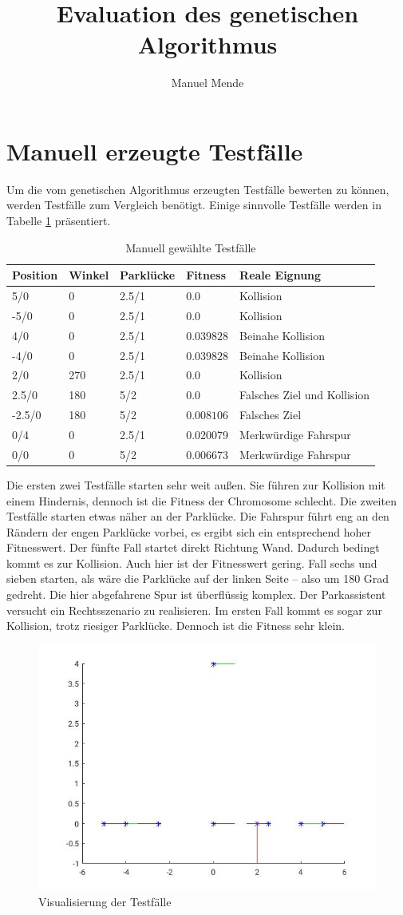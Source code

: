 \documentclass[12pt,a4paper]{article}
\author{Manuel Mende}
\title{Evaluation des genetischen Algorithmus}
\begin{document}
\maketitle
\tableofcontents
\section{Manuell erzeugte Testfälle}
Um die vom genetischen Algorithmus erzeugten Testfälle bewerten zu können, werden Testfälle zum Vergleich benötigt. Einige sinnvolle Testfälle werden in Tabelle \ref{tab:testfaelle} präsentiert.
\begin{table}\centering
\begin{tabular}{l|l|l|l|l}
Position & Winkel & Parklücke & Fitness & Reale Eignung \\\hline
5/0 & 0 & 2.5/1 & $0.0$ & Kollision \\
-5/0 & 0 & 2.5/1 & $0.0$ & Kollision \\
4/0 & 0 & 2.5/1 & $0.039828$ & Beinahe Kollision \\
-4/0 & 0 & 2.5/1 & $0.039828$ & Beinahe Kollision \\
2/0 & 270 & 2.5/1 & $0.0$ & Kollision \\
2.5/0 & 180 & 5/2 & $0.0$ & Falsches Ziel und Kollision \\
-2.5/0 & 180 & 5/2 & $0.008106$ & Falsches Ziel \\
0/4 &  0 & 2.5/1 & 0.020079 & Merkwürdige Fahrspur \\
0/0 &  0 & 5/2 & 0.006673 & Merkwürdige Fahrspur \\
\end{tabular}
\caption{Manuell gewählte Testfälle}
\label{tab:testfaelle}
\end{table}
Die ersten zwei Testfälle starten sehr weit außen. Sie führen zur Kollision mit einem Hindernis, dennoch ist die Fitness der Chromosome schlecht. Die zweiten Testfälle starten etwas näher an der Parklücke. Die Fahrspur führt eng an den Rändern der engen Parklücke vorbei, es ergibt sich ein entsprechend hoher Fitnesswert. Der fünfte Fall startet direkt Richtung Wand. Dadurch bedingt kommt es zur Kollision. Auch hier ist der Fitnesswert gering. Fall sechs und sieben starten, als wäre die Parklücke auf der linken Seite -- also um 180 Grad gedreht. Die hier abgefahrene Spur ist überflüssig komplex. Der Parkassistent versucht ein Rechtsszenario zu realisieren. Im ersten Fall kommt es sogar zur Kollision, trotz riesiger Parklücke. Dennoch ist die Fitness sehr klein.
\begin{figure}\centering
\includegraphics[width=.6\textwidth]{myTestcases.jpg}
\caption{Visualisierung der Testfälle}
\label{fig:testcases}
\end{figure}
\end{document}
